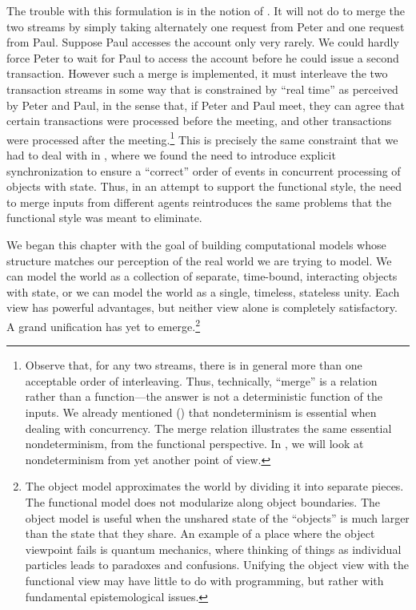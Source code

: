 The trouble with this formulation is in the notion of .  It will
not do to merge the two streams by simply taking alternately one request from
Peter and one request from Paul. Suppose Paul accesses the account only very
rarely.  We could hardly force Peter to wait for Paul to access the account
before he could issue a second transaction.  However such a merge is
implemented, it must interleave the two transaction streams in some way that is
constrained by ``real time'' as perceived by Peter and Paul, in the sense that,
if Peter and Paul meet, they can agree that certain transactions were processed
before the meeting, and other transactions were processed after the
meeting.\footnote{Observe that, for any two streams, there is in general more
than one acceptable order of interleaving.  Thus, technically, ``merge'' is a
relation rather than a function---the answer is not a deterministic function of
the inputs.  We already mentioned () that nondeterminism is
essential when dealing with concurrency.  The merge relation illustrates the
same essential nondeterminism, from the functional perspective.  In
, we will look at nondeterminism from yet another point of view.} This
is precisely the same constraint that we had to deal with in
, where we found the need to introduce explicit synchronization to
ensure a ``correct'' order of events in concurrent processing of objects with
state.  Thus, in an attempt to support the functional style, the need to merge
inputs from different agents reintroduces the same problems that the functional
style was meant to eliminate.

We began this chapter with the goal of building computational models whose
structure matches our perception of the real world we are trying to model.  We
can model the world as a collection of separate, time-bound, interacting
objects with state, or we can model the world as a single, timeless, stateless
unity.  Each view has powerful advantages, but neither view alone is completely
satisfactory.  A grand unification has yet to emerge.\footnote{The object model
approximates the world by dividing it into separate pieces.  The functional
model does not modularize along object boundaries.  The object model is useful
when the unshared state of the ``objects'' is much larger than the state that
they share.  An example of a place where the object viewpoint fails is quantum
mechanics, where thinking of things as individual particles leads to paradoxes
and confusions.  Unifying the object view with the functional view may have
little to do with programming, but rather with fundamental epistemological
issues.}
